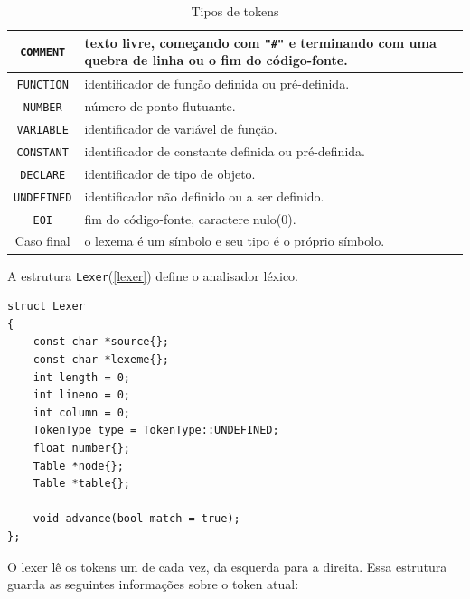 \begin{table}[ht]
\caption{Tipos de tokens}
\label{tokentypes}
\begin{centering}
\begin{tabularx}{\textwidth}{||c|X||}
\hline \texttt{COMMENT} & texto livre, começando com \texttt{"\#"} e
terminando com uma quebra de linha ou o fim do código-fonte.\\ 
\hline \texttt{FUNCTION} & identificador de função definida ou pré-definida.\\
\hline \texttt{NUMBER} & número de ponto flutuante.\\
\hline \texttt{VARIABLE} & identificador de variável de função.\\
\hline \texttt{CONSTANT} &identificador de constante definida ou pré-definida.\\
\hline \texttt{DECLARE} & identificador de tipo de objeto.\\
\hline \texttt{UNDEFINED} & identificador não definido ou a ser definido.\\
\hline \texttt{EOI} & fim do código-fonte, caractere nulo(0).\\
\hline Caso final & o lexema é um símbolo e seu tipo é o próprio símbolo.\\
\hline
\end{tabularx}
\end{centering}
\end{table}

A estrutura \texttt{Lexer}(\ref{lexer}) define o analisador léxico.
\begin{lstlisting}[label=lexer, caption=Extrutura do Lexer]
struct Lexer
{
    const char *source{};
    const char *lexeme{};
    int length = 0;
    int lineno = 0;
    int column = 0;
    TokenType type = TokenType::UNDEFINED;
    float number{};
    Table *node{};
    Table *table{};

    void advance(bool match = true);
};
\end{lstlisting}

O lexer lê os tokens um de cada vez, da esquerda para a direita.
Essa estrutura guarda as seguintes informações sobre o token atual:

